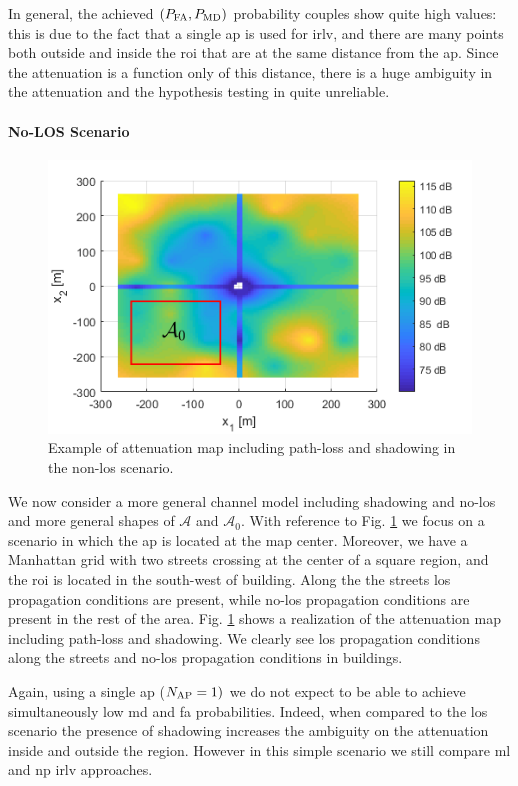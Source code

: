 \documentclass[draftcls,onecolumn,12pt]{IEEEtran}
\begin{document}
In general, the achieved $(P_{\rm FA}, P_{\rm MD})$ probability couples show quite high values: this is due to the fact that a single \ac{ap} is used for \ac{irlv}, and there are many points both outside and inside the \ac{roi} that are at the same distance from the \ac{ap}. Since the attenuation is a function only of this distance, there is a huge ambiguity in the attenuation and the hypothesis testing in quite unreliable.

\paragraph*{No-LOS Scenario} 

\begin{figure}[t]
    \centering
    \includegraphics[width=0.6\columnwidth]{surfColorato.png}
    \caption{Example of attenuation map including path-loss and shadowing in the non-\ac{los} scenario.}
    \label{fig:map}
\end{figure}

We now consider a more general channel model including shadowing and no-\ac{los} and more general shapes of $\mathcal A$ and $\mathcal A_0$. With reference to Fig. \ref{fig:map} we focus on a scenario in which the \ac{ap} is located at the map center. Moreover, we have  a Manhattan grid with two streets crossing at the center of a square region, and the \ac{roi} is located in the south-west of building. Along the the streets \ac{los} propagation conditions are present, while no-\ac{los} propagation conditions are present in the rest of the area. Fig. \ref{fig:map} shows a realization of the  attenuation map including path-loss and shadowing. We clearly see \ac{los} propagation conditions along the streets and no-\ac{los} propagation conditions in buildings.

Again, using a single \ac{ap} ($N_{\rm AP} =1)$ we do not expect to be able to achieve simultaneously low \ac{md} and \ac{fa} probabilities. Indeed, when compared to the \ac{los} scenario the presence of shadowing increases the ambiguity on the attenuation inside and outside the region. However in this simple scenario we still compare \ac{ml} and \ac{np} \ac{irlv} approaches.  
\end{document}
